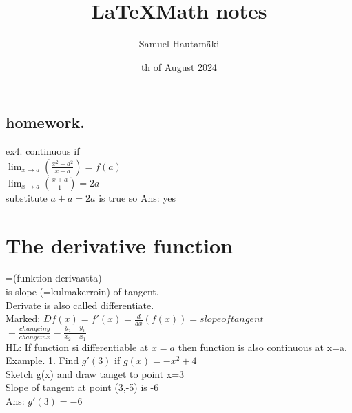\documentclass{article}
\title{\LaTeX Math notes}
\author{Samuel Hautamäki}
\date{th of August 2024}
\begin{document}
  \maketitle
   
  \subsection{homework.}

  ex4. continuous if\\
  $\lim_{x\to a}(\frac{x^2-a^2}{x-a})=f(a)$\\
  $\lim_{x\to a}(\frac{x+a}{1})=2a$\\
  substitute $a+a=2a$ is true so Ans: yes\\

  \section{The derivative function}
  =(funktion derivaatta)\\
  is slope (=kulmakerroin) of tangent.\\
  Derivate is also called differentiate.\\
  Marked: $D f(x)= f'(x)=\frac{d}{dx}(f(x))=slope of tangent$\\
  $=\frac{change in y}{change in x}=\frac{y_2-y_1}{x_2-x_1}$\\
  HL: If function si differentiable at $x=a$ then function is also continuous at x=a.\\
  Example. 1. Find $g'(3)$ if $g(x)=-x^2+4$\\
  Sketch g(x) and draw tanget to point x=3\\
  Slope of tangent at point (3,-5) is -6\\
  Ans: $g'(3)=-6$\\
\end{document}
